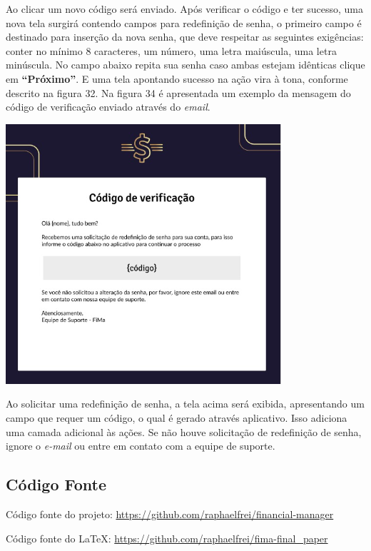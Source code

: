 Ao clicar um novo código será enviado. Após verificar o código e ter sucesso, uma nova tela surgirá contendo campos para redefinição de senha, o primeiro campo é destinado para inserção da nova senha, que deve respeitar as seguintes exigências: conter no mínimo 8 caracteres, um número, uma letra maiúscula, uma letra minúscula. No campo abaixo repita sua senha caso ambas estejam idênticas clique em \textbf{“Próximo”}. E uma tela apontando sucesso na ação vira à tona, conforme descrito na figura 32. Na figura 34 é apresentada um exemplo da mensagem do código de verificação enviado através do \textit{email}.

    \vspace{\baselineskip}
    \begin{center}
        \begin{minipage}{\textwidth}
            \centering
            \includegraphics[scale=0.6]{figs/img_6_1.png}
            \label{fig:figura33}
        \end{minipage}
    \end{center}   

Ao solicitar uma redefinição de senha, a tela acima será exibida, apresentando um campo que requer um código, o qual é gerado através aplicativo. Isso adiciona uma camada adicional às ações. Se não houve solicitação de redefinição de senha, ignore o \textit{e-mail} ou entre em contato com a equipe de suporte.

\subsection{Código Fonte}

Código fonte do projeto: \href{https://github.com/raphaelfrei/financial-manager}{https://github.com/raphaelfrei/financial-manager}

Código fonte do LaTeX: \href{https://github.com/raphaelfrei/fima-final_paper}{https://github.com/raphaelfrei/fima-final\_paper}